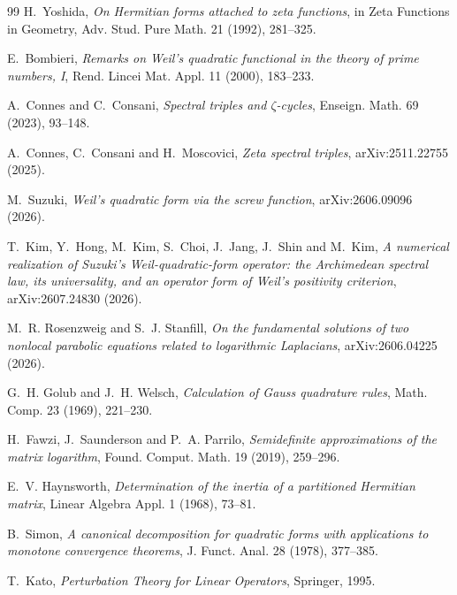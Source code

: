 \documentclass[10pt]{article}
\begin{document}
\begin{thebibliography}{99}\footnotesize
\setlength{\itemsep}{0pt}
H.~Yoshida, \emph{On Hermitian forms attached to zeta functions}, in Zeta
Functions in Geometry, Adv. Stud. Pure Math. 21 (1992), 281--325.

E.~Bombieri, \emph{Remarks on Weil's quadratic functional in the theory of
prime numbers, I}, Rend. Lincei Mat. Appl. 11 (2000), 183--233.

A.~Connes and C.~Consani, \emph{Spectral triples and $\zeta$-cycles},
Enseign. Math. 69 (2023), 93--148.

A.~Connes, C.~Consani and H.~Moscovici, \emph{Zeta spectral triples},
arXiv:2511.22755 (2025).

M.~Suzuki, \emph{Weil's quadratic form via the screw function},
arXiv:2606.09096 (2026).

T.~Kim, Y.~Hong, M.~Kim, S.~Choi, J.~Jang, J.~Shin and M.~Kim,
\emph{A numerical realization of Suzuki's Weil-quadratic-form operator: the
Archimedean spectral law, its universality, and an operator form of Weil's
positivity criterion},
arXiv:2607.24830 (2026).

M.~R. Rosenzweig and S.~J. Stanfill, \emph{On the fundamental solutions of
two nonlocal parabolic equations related to logarithmic Laplacians},
arXiv:2606.04225 (2026).

G.~H. Golub and J.~H. Welsch, \emph{Calculation of Gauss quadrature rules},
Math. Comp. 23 (1969), 221--230.

H.~Fawzi, J.~Saunderson and P.~A. Parrilo, \emph{Semidefinite approximations
of the matrix logarithm}, Found. Comput. Math. 19 (2019), 259--296.

E.~V. Haynsworth, \emph{Determination of the inertia of a partitioned Hermitian
matrix}, Linear Algebra Appl. 1 (1968), 73--81.

B.~Simon, \emph{A canonical decomposition for quadratic forms with
applications to monotone convergence theorems}, J. Funct. Anal. 28 (1978),
377--385.

T.~Kato, \emph{Perturbation Theory for Linear Operators}, Springer, 1995.
\end{thebibliography}
\end{document}
